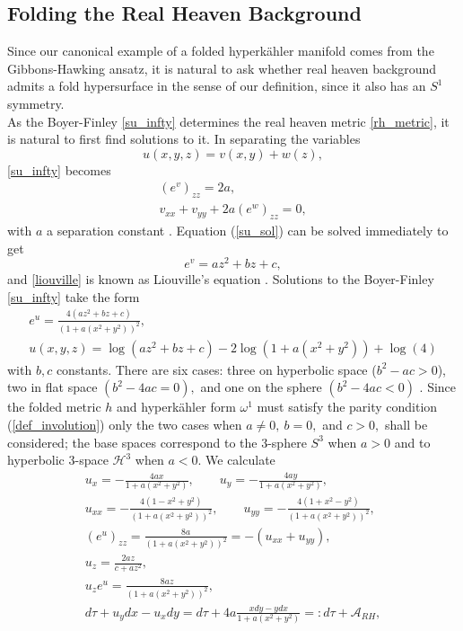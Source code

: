 \documentclass[a4paper,12pt, onecolumn, notitlepage]{article}
\theoremstyle{definition}
\theoremstyle{remark}
\newcommand{\w}{\omega}
\newcommand{\HK}{hyperk\"ahler }
\begin{document}
\subsection{Folding the Real Heaven Background}
Since our canonical example of a folded \HK manifold comes from the Gibbons-Hawking ansatz, it is natural to ask whether real heaven background admits a fold hypersurface in the sense of our definition, since it also has an $S^{1}$ symmetry.\\
As the Boyer-Finley \cref{su_infty} determines the real heaven metric \cref{rh_metric}, it is natural to first find solutions to it. In separating the variables
\begin{equation*}
	u(x,y,z) = v(x,y) + w(z),
\end{equation*}
\cref{su_infty} becomes
\begin{subequations}
	\begin{gather}
	\label{su_sol}
	(e^{v})_{zz} = 2a,\\
	\label{liouville}
	v_{xx} + v_{yy} + 2a(e^{w})_{zz}=0,
	\end{gather}
\end{subequations}
with $a$ a separation constant \cite{tod_1995}. Equation (\ref{su_sol}) can be solved immediately to get
\begin{equation}
	e^{v} = az^{2} + bz + c,
\end{equation}
and \cref{liouville} is known as Liouville's equation \cite{tod_1995}. Solutions to the Boyer-Finley \cref{su_infty} take the form
\begin{gather*}
	e^{u}=\frac{4(az^{2}+bz+c)}{(1+a(x^{2}+y^{2}))^{2}},\\
	u(x,y,z) = \log(az^{2}+bz+c)-2\log(1+a(x^{2}+y^{2})) +\log(4)
\end{gather*}
with $b,c$ constants. There are six cases: three on hyperbolic space ($b^{2}-ac>0$), two in flat space $(b^{2}-4ac=0),$ and one on the sphere $(b^{2}-4ac<0)$ \cite{tod_1995}. Since the folded metric $h$ and \HK form $\w^{1}$ must satisfy the parity condition (\ref{def_involution}) only the two cases when $a\neq 0,\ b=0,$ and $c>0,$ shall be considered; the base spaces correspond to the 3-sphere $S^{3}$ when $a>0$ and to hyperbolic 3-space $\mathcal{H}^{3}$ when $a<0.$ We calculate
\begin{subequations}
	\begin{gather*}
	u_{x} = -\frac{4ax}{1+a(x^{2} + y^{2})}, \qquad u_{y} = -\frac{4ay}{1+a(x^{2} + y^{2})},\\
	u_{xx} = -\frac{4(1-x^{2}+y^{2})}{(1+a(x^{2} + y^{2}))^{2}},\qquad u_{yy} = -\frac{4(1+x^{2}-y^{2})}{(1+a(x^{2} + y^{2}))^{2}},\\
	(e^{u})_{zz} = \frac{8a}{(1+a(x^{2} + y^{2}))^{2}} = -(u_{xx} + u_{yy}),\\
	u_{z} = \frac{2az}{c+az^{2}},\\
	u_{z}e^{u} = \frac{8az}{(1+a(x^{2} + y^{2}))^{2}},\\
	d\tau + u_{y}dx-u_{x}dy = d\tau + 4a\frac{xdy-ydx}{1+a(x^{2} + y^{2})} =: d\tau + \mathcal{A}_{RH},
	\end{gather*}
\end{subequations}
\end{document}
